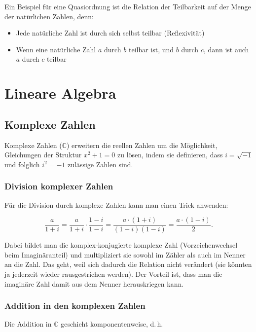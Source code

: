 \documentclass{scrartcl}
\begin{document}
Ein Beispiel für eine Quasiordnung ist die Relation der Teilbarkeit auf
der Menge der natürlichen Zahlen, denn:

\begin{itemize}
	\item Jede natürliche Zahl ist durch sich selbst teilbar (Reflexivität)
	\item Wenn eine natürliche Zahl $a$ durch $b$ teilbar ist, und $b$ durch
		$c$, dann ist auch $a$ durch $c$ teilbar
\end{itemize}


\section{Lineare Algebra}

\subsection{Komplexe Zahlen}

Komplexe Zahlen ($\mathbb{C}$) erweitern die reellen Zahlen um die Möglichkeit, Gleichungen
der Struktur $x^2 + 1 = 0$ zu lösen, indem sie definieren, dass $i = \sqrt{-1}$ und folglich
$i^2 = -1$ zulässige Zahlen sind.

\subsubsection{Division komplexer Zahlen}

Für die Division durch komplexe Zahlen kann man einen Trick anwenden:

\begin{equation}
	\frac{a}{1 + i} = \frac{a}{1 + i} \cdot \frac{1 - i}{1 - i} =
	\frac{a \cdot (1 + i)}{(1 - i)(1 - i)} = 
	\frac{a \cdot (1 - i)}{2}.
\end{equation}

Dabei bildet man die komplex-konjugierte komplexe Zahl (Vorzeichenwechsel beim Imaginäranteil) und multipliziert sie sowohl im
Zähler als auch im Nenner an die Zahl. Das geht, weil sich dadurch die Relation nicht verändert (sie könnten ja jederzeit
wieder rausgestrichen werden). Der Vorteil ist, dass man die imaginäre Zahl damit aus dem 
Nenner herauskriegen kann.

\subsubsection{Addition in den komplexen Zahlen}

Die Addition in $\mathbb{C}$ geschieht komponentenweise, d.\,h.
\end{document}
